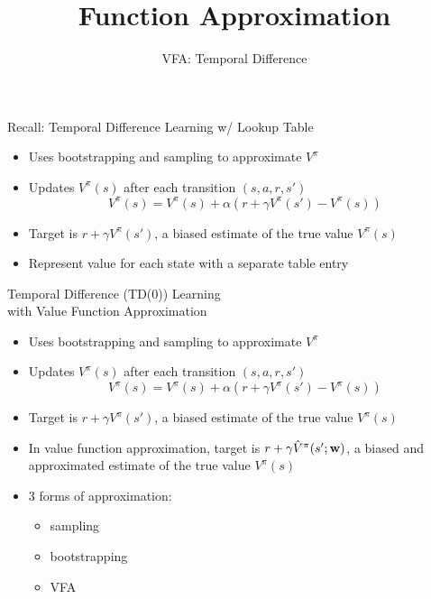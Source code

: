 \documentclass[aspectratio=169]{../latex_main/tntbeamer}  %
\title[RL: Function Approximation]{Function Approximation}
\subtitle{VFA: Temporal Difference}
\begin{document}
	
	\maketitle

\begin{frame}[c]{Recall: Temporal Difference Learning w/ Lookup Table}
	
	\begin{itemize}
		\item Uses bootstrapping and sampling to approximate $V^\pi$
		\item Updates $V^\pi(s)$ after each transition $(s,a,r,s')$
		$$V^\pi(s) = V^\pi (s) + \alpha(r + \gamma V^\pi (s') - V^\pi(s)) $$
		\item Target is $r + \gamma V^\pi(s')$, a biased estimate of the true value $V^\pi(s)$
		\item Represent value for each state with a separate \alert{table entry}
	\end{itemize}

\end{frame}
\begin{frame}[c]{Temporal Difference (TD(0)) Learning\\ with Value Function Approximation}
	
	\begin{itemize}
		\item Uses bootstrapping and sampling to approximate $V^\pi$
		\item Updates $V^\pi(s)$ after each transition $(s,a,r,s')$
		$$V^\pi(s) = V^\pi (s) + \alpha(r + \gamma V^\pi (s') - V^\pi(s)) $$
		\item Target is $r + \gamma V^\pi(s')$, a biased estimate of the true value $V^\pi(s)$
		\item In value \alert{function approximation}, target is $r + \gamma \hat{V}^\pi (s'; \mathbf{w})$, a biased and approximated estimate of the true value $V^\pi(s)$
		\item 3 forms of approximation: 
		\begin{itemize}
			\item sampling
			\item bootstrapping
			\item VFA
		\end{itemize}
	\end{itemize}
	
\end{frame}
\end{document}
